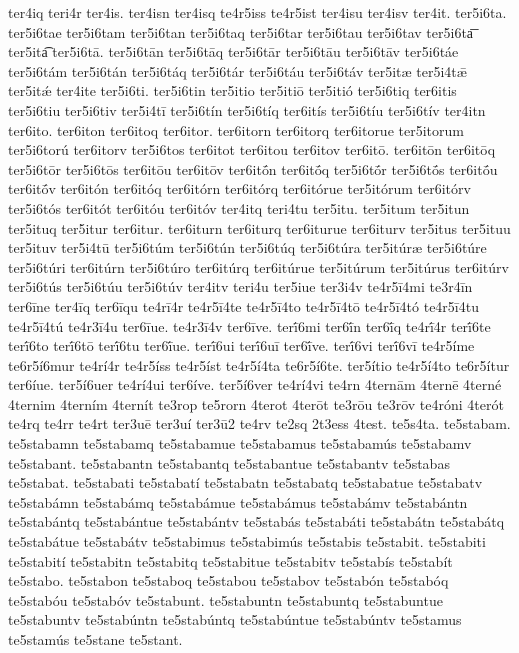 {ter4iq
teri4r
ter4is.
ter4isn
ter4isq
te4r5iss
te4r5ist
ter4isu
ter4isv
ter4it.
ter5i6ta.
ter5i6tae
ter5i6tam
ter5i6tan
ter5i6taq
ter5i6tar
ter5i6tau
ter5i6tav
ter5i6ta͞
ter5ita͡
ter5i6tā.
ter5i6tān
ter5i6tāq
ter5i6tār
ter5i6tāu
ter5i6tāv
ter5i6táe
ter5i6tám
ter5i6tán
ter5i6táq
ter5i6tár
ter5i6táu
ter5i6táv
ter5itæ
ter5i4tǣ
ter5itǽ
ter4ite
ter5i6ti.
ter5i6tin
ter5itio
ter5itiō
ter5itió
ter5i6tiq
ter6itis
ter5i6tiu
ter5i6tiv
ter5i4tī
ter5i6tín
ter5i6tíq
ter6itís
ter5i6tíu
ter5i6tív
ter4itn
ter6ito.
ter6iton
ter6itoq
ter6itor.
ter6itorn
ter6itorq
ter6itorue
ter5itorum
ter5i6torú
ter6itorv
ter5i6tos
ter6itot
ter6itou
ter6itov
ter6itō.
ter6itōn
ter6itōq
ter5i6tōr
ter5i6tōs
ter6itōu
ter6itōv
ter6itṓn
ter6itṓq
ter5i6tṓr
ter5i6tṓs
ter6itṓu
ter6itṓv
ter6itón
ter6itóq
ter6itórn
ter6itórq
ter6itórue
ter5itórum
ter6itórv
ter5i6tós
ter6itót
ter6itóu
ter6itóv
ter4itq
teri4tu
ter5itu.
ter5itum
ter5itun
ter5ituq
ter5itur
ter6itur.
ter6iturn
ter6iturq
ter6iturue
ter6iturv
ter5itus
ter5ituu
ter5ituv
ter5i4tū
ter5i6túm
ter5i6tún
ter5i6túq
ter5i6túra
ter5itúræ
ter5i6túre
ter5i6túri
ter6itúrn
ter5i6túro
ter6itúrq
ter6itúrue
ter5itúrum
ter5itúrus
ter6itúrv
ter5i6tús
ter5i6túu
ter5i6túv
ter4itv
teri4u
ter5iue
ter3i4v
te4r5ī4mi
te3r4īn
ter6īne
ter4īq
ter6īqu
te4rī4r
te4r5ī4te
te4r5ī4to
te4r5ī4tō
te4r5ī4tó
te4r5ī4tu
te4r5ī4tú
te4r3ī4u
ter6īue.
te4r3ī4v
ter6īve.
terī́6mi
ter6ī́n
ter6ī́q
te4rī́4r
terī́6te
terī́6to
terī́6tō
terī́6tu
ter6ī́ue.
terī́6ui
terī́6uī
ter6ī́ve.
terī́6vi
terī́6vī
te4r5íme
te6r5í6mur
te4rí4r
te4r5íss
te4r5íst
te4r5í4ta
te6r5í6te.
ter5ítio
te4r5í4to
te6r5ítur
ter6íue.
ter5í6uer
te4rí4ui
ter6íve.
ter5í6ver
te4rí4vi
te4rn
4ternām
4ternē
4terné
4ternim
4terním
4ternít
te3rop
te5rorn
4terot
4terōt
te3rōu
te3rōv
te4róni
4terót
te4rq
te4rr
te4rt
ter3uē
ter3uí
ter3ū2
te4rv
te2sq
2t3ess
4test.
te5s4ta.
te5stabam.
te5stabamn
te5stabamq
te5stabamue
te5stabamus
te5stabamús
te5stabamv
te5stabant.
te5stabantn
te5stabantq
te5stabantue
te5stabantv
te5stabas
te5stabat.
te5stabati
te5stabatí
te5stabatn
te5stabatq
te5stabatue
te5stabatv
te5stabámn
te5stabámq
te5stabámue
te5stabámus
te5stabámv
te5stabántn
te5stabántq
te5stabántue
te5stabántv
te5stabás
te5stabáti
te5stabátn
te5stabátq
te5stabátue
te5stabátv
te5stabimus
te5stabimús
te5stabis
te5stabit.
te5stabiti
te5stabití
te5stabitn
te5stabitq
te5stabitue
te5stabitv
te5stabís
te5stabít
te5stabo.
te5stabon
te5staboq
te5stabou
te5stabov
te5stabón
te5stabóq
te5stabóu
te5stabóv
te5stabunt.
te5stabuntn
te5stabuntq
te5stabuntue
te5stabuntv
te5stabúntn
te5stabúntq
te5stabúntue
te5stabúntv
te5stamus
te5stamús
te5stane
te5stant.
}
